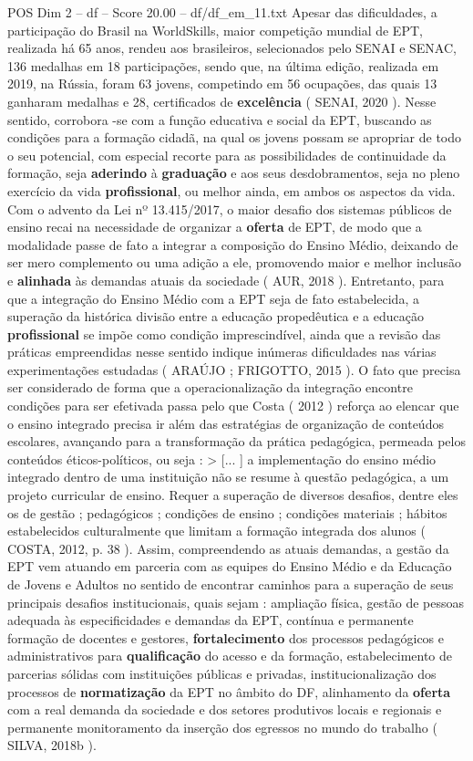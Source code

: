 \begin{textsample}{POS Dim 2 – df – Score 20.00 – df/df\_em\_11.txt}
Apesar das dificuldades, a participação do Brasil na WorldSkills, maior competição mundial de EPT, realizada há 65 anos, rendeu aos brasileiros, selecionados pelo SENAI e SENAC, 136 medalhas em 18 participações, sendo que, na última edição, realizada em 2019, na Rússia, foram 63 jovens, competindo em 56 ocupações, das quais 13 ganharam medalhas e 28, certificados de \textbf{excelência} ( SENAI, 2020 ).
Nesse sentido, corrobora -se com a função educativa e social da EPT, buscando as condições para a formação cidadã, na qual os jovens possam se apropriar de todo o seu potencial, com especial recorte para as possibilidades de continuidade da formação, seja \textbf{aderindo} à \textbf{graduação} e aos seus desdobramentos, seja no pleno exercício da vida \textbf{profissional}, ou melhor ainda, em ambos os aspectos da vida.
Com o advento da Lei nº 13.415/2017, o maior desafio dos sistemas públicos de ensino recai na necessidade de organizar a \textbf{oferta} de EPT, de modo que a modalidade passe de fato a integrar a composição do Ensino Médio, deixando de ser mero complemento ou uma adição a ele, promovendo maior e melhor inclusão e \textbf{alinhada} às demandas atuais da sociedade ( AUR, 2018 ).
Entretanto, para que a integração do Ensino Médio com a EPT seja de fato estabelecida, a superação da histórica divisão entre a educação propedêutica e a educação \textbf{profissional} se impõe como condição imprescindível, ainda que a revisão das práticas empreendidas nesse sentido indique inúmeras dificuldades nas várias experimentações estudadas ( ARAÚJO ; FRIGOTTO, 2015 ).
O fato que precisa ser considerado de forma que a operacionalização da integração encontre condições para ser efetivada passa pelo que Costa ( 2012 ) reforça ao elencar que o ensino integrado precisa ir além das estratégias de organização de conteúdos escolares, avançando para a transformação da prática pedagógica, permeada pelos conteúdos éticos-políticos, ou seja : > [... ] a implementação do ensino médio integrado dentro de uma instituição não se resume à questão pedagógica, a um projeto curricular de ensino.
Requer a superação de diversos desafios, dentre eles os de gestão ; pedagógicos ; condições de ensino ; condições materiais ; hábitos estabelecidos culturalmente que limitam a formação integrada dos alunos ( COSTA, 2012, p. 38 ).
Assim, compreendendo as atuais demandas, a gestão da EPT vem atuando em parceria com as equipes do Ensino Médio e da Educação de Jovens e Adultos no sentido de encontrar caminhos para a superação de seus principais desafios institucionais, quais sejam : ampliação física, gestão de pessoas adequada às especificidades e demandas da EPT, contínua e permanente formação de docentes e gestores, \textbf{fortalecimento} dos processos pedagógicos e administrativos para \textbf{qualificação} do acesso e da formação, estabelecimento de parcerias sólidas com instituições públicas e privadas, institucionalização dos processos de \textbf{normatização} da EPT no âmbito do DF, alinhamento da \textbf{oferta} com a real demanda da sociedade e dos setores produtivos locais e regionais e permanente monitoramento da inserção dos egressos no mundo do trabalho ( SILVA, 2018b ).


\end{textsample}
